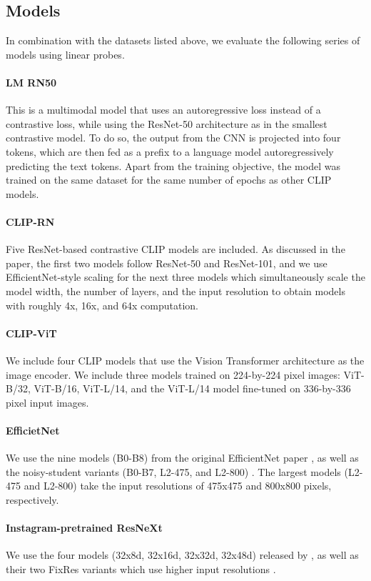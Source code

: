 \documentclass{article}
\begin{document}
\subsection{Models}

In combination with the datasets listed above, we evaluate the following series of models using linear probes.

\paragraph{LM RN50} This is a multimodal model that uses an autoregressive loss instead of a contrastive loss, while using the ResNet-50 architecture as in the smallest contrastive model. To do so, the output from the CNN is projected into four tokens, which are then fed as a prefix to a language model autoregressively predicting the text tokens. Apart from the training objective, the model was trained on the same dataset for the same number of epochs as other CLIP models.
\paragraph{CLIP-RN} Five ResNet-based contrastive CLIP models are included. As discussed in the paper, the first two models follow ResNet-50 and ResNet-101, and we use EfficientNet-style \cite{tan2019efficientnet} scaling for the next three models which simultaneously scale the model width, the number of layers, and the input resolution to obtain models with roughly 4x, 16x, and 64x computation.
\paragraph{CLIP-ViT} We include four CLIP models that use the Vision Transformer \cite{dosovitskiy2020image} architecture as the image encoder. We include three models trained on 224-by-224 pixel images: ViT-B/32, ViT-B/16, ViT-L/14, and the ViT-L/14 model fine-tuned on 336-by-336 pixel input images.
\paragraph{EfficietNet} We use the nine models (B0-B8) from the original EfficientNet paper \cite{tan2019efficientnet}, as well as the noisy-student variants (B0-B7, L2-475, and L2-800) \citep{tan2019efficientnet}. The largest models (L2-475 and L2-800) take the input resolutions of 475x475 and 800x800 pixels, respectively.
\paragraph{Instagram-pretrained ResNeXt} We use the four models (32x8d, 32x16d, 32x32d, 32x48d) released by \cite{mahajan2018exploring}, as well as their two FixRes variants which use higher input resolutions \cite{touvron2019fixing}.
\end{document}
